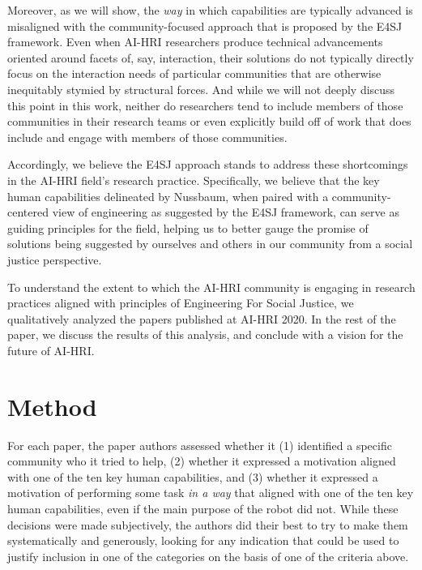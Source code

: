 \documentclass[letterpaper]{article} %
\begin{document}
Moreover, as we will show, the \textit{way} in which capabilities are typically advanced is misaligned with the community-focused approach that is proposed by the E4SJ framework.
Even when AI-HRI researchers produce technical advancements oriented around facets of, say, interaction, their solutions do not typically directly focus on the interaction needs of particular communities that are otherwise inequitably stymied by structural forces. And while we will not deeply discuss this point in this work, neither do researchers tend to include members of those communities in their research teams or even explicitly build off of work that does include and engage with members of those communities.

Accordingly, we believe the E4SJ approach stands to address these shortcomings in the AI-HRI field's research practice. Specifically, we believe that the key human capabilities delineated by Nussbaum, when paired with a community-centered view of engineering as suggested by the E4SJ framework, can serve as guiding principles for the field, helping us to better gauge the promise of solutions being suggested by ourselves and others in our community from a social justice perspective.



To understand the extent to which the AI-HRI community is engaging in research practices aligned with principles of Engineering For Social Justice, we qualitatively analyzed the papers published at AI-HRI 2020. In the rest of the paper, we discuss the results of this analysis, and conclude with a vision for the future of AI-HRI.

\section{Method}
 For each paper, the paper authors assessed whether it (1) identified a specific community who it tried to help, (2) whether it expressed a motivation aligned with one of the ten key human capabilities, and (3) whether it expressed a motivation of performing some task \textit{in a way} that aligned with one of the ten key human capabilities, even if the main purpose of the robot did not. While these decisions were made subjectively, the authors did their best to try to make them systematically and generously, looking for any indication that could be used to justify inclusion in one of the categories on the basis of one of the criteria above.
\end{document}
